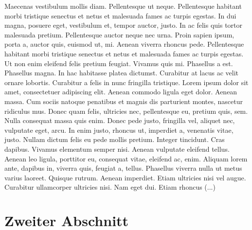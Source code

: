 Maecenas vestibulum mollis diam. Pellentesque ut neque. Pellentesque habitant morbi tristique senectus et netus et malesuada fames ac turpis egestas. In dui magna, posuere eget, vestibulum et, tempor auctor, justo. In ac felis quis tortor malesuada pretium. Pellentesque auctor neque nec urna. Proin sapien ipsum, porta a, auctor quis, euismod ut, mi. Aenean viverra rhoncus pede. Pellentesque habitant morbi tristique senectus et netus et malesuada fames ac turpis egestas. Ut non enim eleifend felis pretium feugiat. Vivamus quis mi. Phasellus a est. Phasellus magna. In hac habitasse platea dictumst. Curabitur at lacus ac velit ornare lobortis. Curabitur a felis in nunc fringilla tristique. Lorem ipsum dolor sit amet, consectetuer adipiscing elit. Aenean commodo ligula eget dolor. Aenean massa. Cum sociis natoque penatibus et magnis dis parturient montes, nascetur ridiculus mus. Donec quam felis, ultricies nec, pellentesque eu, pretium quis, sem. Nulla consequat massa quis enim. Donec pede justo, fringilla vel, aliquet nec, vulputate eget, arcu. In enim justo, rhoncus ut, imperdiet a, venenatis vitae, justo. Nullam dictum felis eu pede mollis pretium. Integer tincidunt. Cras dapibus. Vivamus elementum semper nisi. Aenean vulputate eleifend tellus. Aenean leo ligula, porttitor eu, consequat vitae, eleifend ac, enim. Aliquam lorem ante, dapibus in, viverra quis, feugiat a, tellus. Phasellus viverra nulla ut metus varius laoreet. Quisque rutrum. Aenean imperdiet. Etiam ultricies nisi vel augue. Curabitur ullamcorper ultricies nisi. Nam eget dui. Etiam rhoncus (...)

\section{Zweiter Abschnitt}


